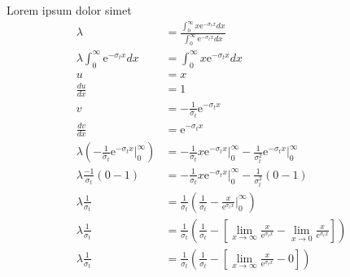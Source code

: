 \documentclass{hw}
\begin{document}
\solution
    Lorem ipsum dolor simet
    \begin{align*}
        \lambda &= \frac{\int_0^\infty x \mathrm{e}^{-\sigma_t x} dx }{\int_0^\infty \mathrm{e}^{-\sigma_t x} dx} \\
        \lambda \int_0^\infty \mathrm{e}^{-\sigma_t x} dx &= \int_0^\infty x \mathrm{e}^{-\sigma_t x} dx \\
        u &= x \\
        \frac{du}{dx} &= 1 \\
        v &= -\frac{1}{\sigma_t} \mathrm{e}^{-\sigma_t x} \\
        \frac{dv}{dx} &= \mathrm{e}^{-\sigma_t x} \\
        \lambda \left(-\frac{1}{\sigma_t} \mathrm{e}^{-\sigma_t x} \Big|_0^\infty\right) &= -\frac{1}{\sigma_t} x \mathrm{e}^{-\sigma_t x}\Big|_0^\infty - \frac{1}{\sigma_t^2}\mathrm{e}^{-\sigma_t x}\Big|_0^\infty \\
        \lambda \frac{-1}{\sigma_t} \left( 0 - 1 \right) &= -\frac{1}{\sigma_t} x \mathrm{e}^{-\sigma_t x}\Big|_0^\infty - \frac{1}{\sigma_t^2} \left( 0 - 1 \right) \\
        \lambda \frac{1}{\sigma_t} &= \frac{1}{\sigma_t} \left( \frac{1}{\sigma_t} - \frac{x}{\mathrm{e}^{\sigma_t x}}\Big|_0^\infty \right) \\
        \lambda \frac{1}{\sigma_t} &= \frac{1}{\sigma_t} \left( \frac{1}{\sigma_t} - \left[ \lim_{x\to\infty}\frac{x}{\mathrm{e}^{\sigma_t x}} - \lim_{x\to0}\frac{x}{\mathrm{e}^{\sigma_t x}} \right] \right) \\
        \lambda \frac{1}{\sigma_t} &= \frac{1}{\sigma_t} \left( \frac{1}{\sigma_t} - \left[ \lim_{x\to\infty}\frac{x}{\mathrm{e}^{\sigma_t x}} - 0 \right] \right) \\
    \end{align*}
\end{document}
